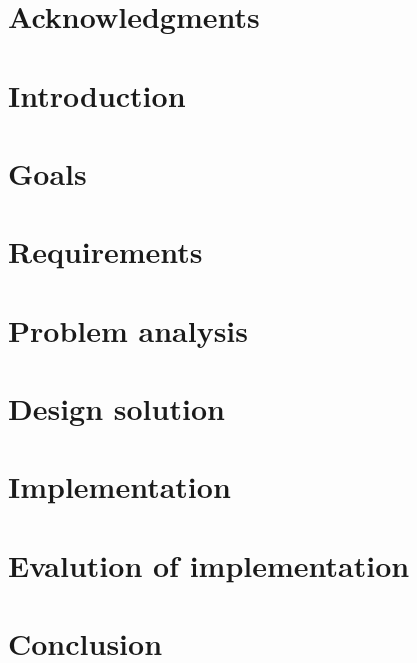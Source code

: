 \documentclass{article}
\begin{document}

\clearpage

\section*{Acknowledgments}

\clearpage

\tableofcontents
\clearpage

\section{Introduction}

\clearpage
\section{Goals}

\clearpage
\section{Requirements}

\clearpage
\section{Problem analysis}

\clearpage
\section{Design solution}

\clearpage
\section{Implementation}

\clearpage
\section{Evalution of implementation}

\clearpage
\section{Conclusion}

\clearpage
\end{document}
